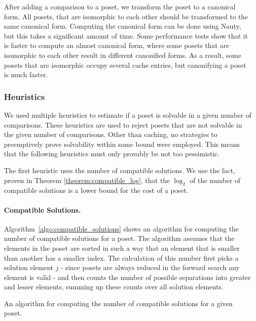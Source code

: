 \documentclass[twoside,leqno,twocolumn]{article}
\begin{document}
After adding a comparison to a poset, we transform the poset to a canonical form.
All posets, that are isomorphic to each other should be transformed to the same canonical form.
Computing the canonical form can be done using Nauty, but this takes a significant amount of time.
Some performance tests show that it is faster to compute an almost canonical form, where some posets that are isomorphic to each other result in different canonified forms.
As a result, some posets that are isomorphic occupy several cache entries, but canonifying a poset is much faster.

\subsubsection{Heuristics}

We used multiple heuristics to estimate if a poset is solvable in a given number of comparisons.
These heuristics are used to reject posets that are not solvable in the given number of comparisons.
Other than caching, no strategies to preemptively prove solvability within some bound were employed.
This means that the following heuristics must only provably be not too pessimistic. %

The first heuristic uses the number of compatible solutions.
We use the fact, proven in Theorem \ref{theorem:compatible_log}, that the $\log_2$ of the number of compatible solutions is a lower bound for the cost of a poset.

\paragraph{Compatible Solutions.}
Algorithm~\ref{algo:compatible_solutions} shows an algorithm for computing the number of compatible solutions for a poset.
The algorithm assumes that the elements in the poset are sorted in such a way that an element that is smaller than another has a smaller index.
The calculation of this number first picks a solution element $j$ - since posets are always reduced in the forward search any element is valid - and then counts the number of possible separations into greater and lesser elements, summing up these counts over all solution elements.

\begin{algorithm}[t]
  \centering
  
  \caption{An algorithm for computing the number of compatible solutions for a given poset.}
  \label{algo:compatible_solutions}
\end{algorithm}
\end{document}
